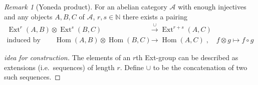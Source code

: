 \documentclass[english,headsepline=0.25pt]{scrartcl}
\theoremstyle{definition}
\theoremstyle{remark}
\newtheorem{Rem}[Def]{Remark}
\newcommand*{\N}{\mathds{N}}
\DeclareMathOperator{\Ext}{Ext} %
\DeclareMathOperator{\Hom}{Hom} %
\newcommand*{\idest}{i.e.\ }
\begin{document}
\begin{Rem}[Yoneda product]\label{yonedaproduct}
  For an abelian category $\mathcal{A}$ with enough injectives and
  any objects $A,B,C$ of $\mathcal{A}$, $r,s\in\N$ there exists a pairing
  \begin{align*}
    \Ext^r(A,B)\otimes\Ext^s(B,C) &\overset{\cup}{\longrightarrow}
                                    \Ext^{r+s}(A,C)
    \\
    \text{induced by}\qquad
    \Hom(A,B)\otimes\Hom(B,C) &\longrightarrow \Hom(A,C)\;,\quad
                                f\otimes g\mapsto f\circ g
  \end{align*}
  \begin{proof}[idea for construction]
    The elements of an $r$th Ext-group can be described as extensions
    (\idest sequences) of length $r$.
    Define $\cup$ to be the concatenation of two such sequences. 
  \end{proof}
\end{Rem}
\end{document}
